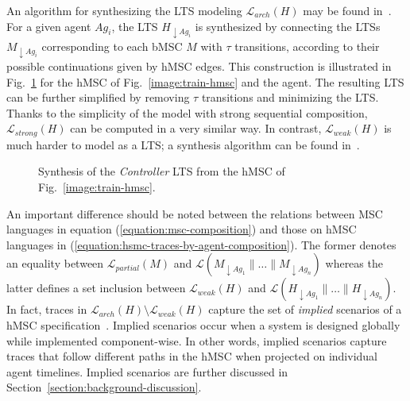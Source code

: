 An algorithm for synthesizing the LTS modeling $\mathcal{L}_{arch}(H)$ may be found in~\cite{Uchitel:2004}. For a given agent $Ag_{i}$, the LTS $H_{\downarrow Ag_i}$ is synthesized by connecting the LTSs $M_{\downarrow Ag_i}$ corresponding to each bMSC $M$ with $\tau$ transitions, according to their possible continuations given by hMSC edges. This construction is illustrated in Fig.~\ref{image:train-controller-synthesis} for the hMSC of Fig.~\ref{image:train-hmsc} and the  agent. The resulting LTS can be further simplified by removing $\tau$ transitions and minimizing the LTS.  Thanks to the simplicity of the model with strong sequential composition, $\mathcal{L}_{strong}(H)$ can be computed in a very similar way. In contrast, $\mathcal{L}_{weak}(H)$ is much harder to model as a LTS; a synthesis algorithm can be found in~\cite{Uchitel:2004}.

\vspace{0.4cm}
\begin{figure}[H]\centering
{}
\caption{Synthesis of the \emph{Controller} LTS from the hMSC of Fig.~\ref{image:train-hmsc}.\label{image:train-controller-synthesis}}
\end{figure}

An important difference should be noted between the relations between MSC languages in equation (\ref{equation:msc-composition}) and those on hMSC languages in (\ref{equation:hsmc-traces-by-agent-composition}). The former denotes an equality between $\mathcal{L}_{partial}(M)$ and $\mathcal{L}(M_{\downarrow Ag_1}\parallel\ldots\parallel M_{\downarrow Ag_n})$ whereas the latter defines a set inclusion between $\mathcal{L}_{weak}(H)$ and $\mathcal{L}(H_{\downarrow Ag_1}\parallel\ldots\parallel H_{\downarrow Ag_n})$. In fact, traces in $\mathcal{L}_{arch}(H) \setminus \mathcal{L}_{weak}(H)$ capture the set of \emph{implied} scenarios of a hMSC specification~\cite{Alur:2000, Uchitel:2004}. Implied scenarios occur when a system is designed globally while implemented component-wise. In other words, implied scenarios capture traces that follow different paths in the hMSC when projected on individual agent timelines. Implied scenarios are further discussed in Section~\ref{section:background-discussion}.

